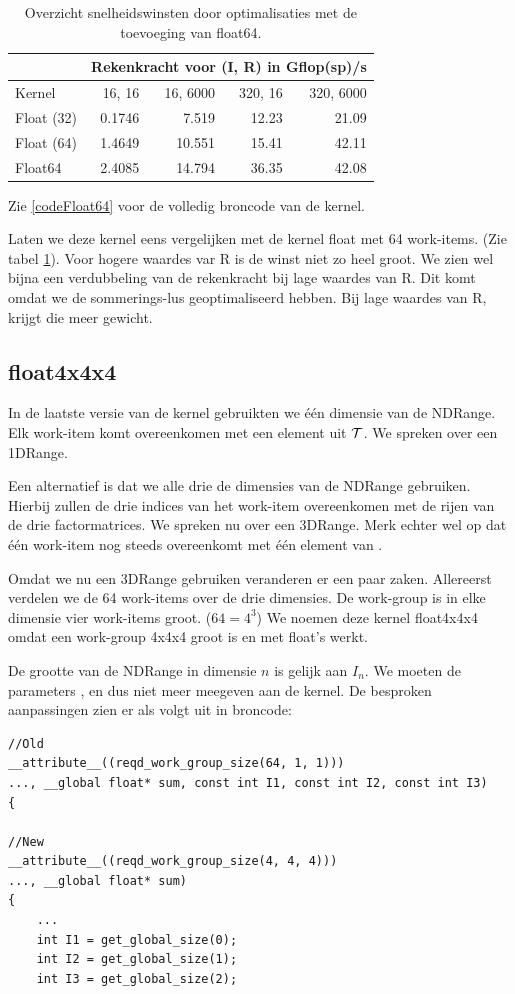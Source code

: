 \begin{table}
	\centering
    \begin{tabular}{|l| r|r| r |r|}
		\hline
						& \multicolumn{4}{c|}{Rekenkracht voor (I, R) in Gflop(sp)/s}\\
		\hline
		Kernel          & 16, 16 	& 16, 6000	& 320, 16	&  320, 6000 \\
		\hline
		Float (32)      & 0.1746  	& 7.519   	& 12.23 	& 21.09 	\\
		Float (64)      & 1.4649	& 10.551  	& 15.41  	& 42.11  	\\
		Float64         & 2.4085 	& 14.794  	& 36.35 	& 42.08 	\\
		\hline
    \end{tabular}
    \caption{\label{measF64} Overzicht snelheidswinsten door optimalisaties met de toevoeging van float64.}
\end{table}

Zie \ref{codeFloat64} voor de volledig broncode van de kernel.

Laten we deze kernel eens vergelijken met de kernel float met 64 work-items. (Zie tabel \ref{measF64}). Voor hogere waardes var R is de winst niet zo heel groot. We zien wel bijna een verdubbeling van de rekenkracht bij lage waardes van R. Dit komt omdat we de sommerings-lus geoptimaliseerd hebben. Bij lage waardes van R, krijgt die meer gewicht.

\subsection{float4x4x4}
In de laatste versie van de kernel gebruikten we \'e\'en dimensie van de NDRange. Elk work-item komt overeenkomen met een element uit $\mathcal{T}$. We spreken over een 1DRange.

Een alternatief is dat we alle drie de dimensies van de NDRange gebruiken. Hierbij zullen de drie indices van het work-item overeenkomen met de rijen van de drie factormatrices. We spreken nu over een 3DRange. Merk echter wel op dat \'e\'en work-item nog steeds overeenkomt met \'e\'en element van \TT.

Omdat we nu een 3DRange gebruiken veranderen er een paar zaken. Allereerst verdelen we de 64 work-items over de drie dimensies. De work-group is in elke dimensie vier work-items groot. ($64 = 4^3$) We noemen deze kernel float4x4x4 omdat een work-group 4x4x4 groot is en met float's werkt.

De grootte van de NDRange in dimensie $n$ is gelijk aan $I_n$. We moeten de parameters ,  en  dus niet meer meegeven aan de kernel. De besproken aanpassingen zien er als volgt uit in broncode:
\begin{lstlisting}
//Old
__attribute__((reqd_work_group_size(64, 1, 1)))
..., __global float* sum, const int I1, const int I2, const int I3)
{

//New
__attribute__((reqd_work_group_size(4, 4, 4)))
..., __global float* sum)
{
	...
	int I1 = get_global_size(0);
	int I2 = get_global_size(1);
	int I3 = get_global_size(2);
\end{lstlisting}


